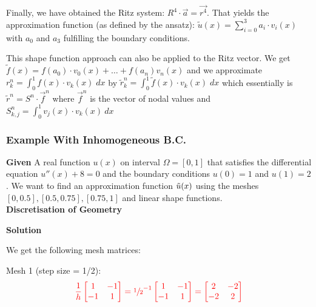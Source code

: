 Finally, we have obtained the Ritz system: $R^4\cdot\vec{a}=\vec{r^4}$.
That yields the approximation function (as defined by the ansatz): $\tilde{u}(x)=\sum_{i=0}^3 a_i\cdot v_i(x)$
with $a_0$ and $a_3$ fulfilling the boundary conditions.

This shape function approach can also be applied to the Ritz vector.
We get $\tilde{f}(x) = f(a_0)\cdot v_0(x)+\ldots+f(a_n)v_n(x)$ and we approximate
$r_{k}^{n}=\int_{0}^{1}f(x)\cdot v_{k}(x)\;dx$ by $\tilde{r}_{k}^{n}=\int_{0}^{1}\tilde{f}(x)\cdot v_{k}(x)\;dx$
which essentially is $\tilde{r}^n = S^n \cdot \vec{f}^n$ where $\vec{f}^n$ is the vector of nodal values
and $S_{k,j}^n=\int_0^1 v_j(x)\cdot v_k(x)\ dx$

\subsubsection{Example With Inhomogeneous B.C.}

\textbf{Given} A real function $u(x)$ on interval $\Omega=[0,1]$ that satisfies the differential equation $u''(x) + 8 = 0$
and the boundary conditions $u(0) = 1$ and $u(1) = 2$. We want to find an approximation function $\tilde{u}(x)$ using the meshes
$[0, 0.5], [0.5, 0.75], [0.75, 1]$ and linear shape functions.
\\[1em]
\textbf{Discretisation of Geometry}

\textbf{Solution}

We get the following mesh matrices:

Mesh 1 (step size = 1/2):
\begin{align*}
    {\color{red}
    \frac{1}{h}\begin{bmatrix}
        1 & -1 \\
        -1 & 1
    \end{bmatrix}
    = \sfrac{1}{2}^{-1} \begin{bmatrix}
        1 & -1 \\
        -1 & 1
    \end{bmatrix}
    =
    \begin{bmatrix}
        2 & -2 \\
        -2 & 2
    \end{bmatrix}
    }
\end{align*}

